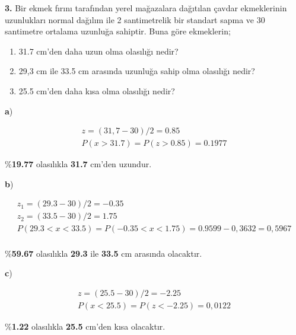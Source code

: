 \documentclass[a4paper,10pt]{article}
\begin{document}
\pagebreak

\textbf{3.} Bir ekmek fırını tarafından yerel mağazalara dağıtılan çavdar ekmeklerinin uzunlukları normal dağılım ile 2
santimetrelik bir standart sapma ve 30 santimetre ortalama uzunluğa sahiptir. Buna göre ekmeklerin;

\begin{center}
  \begin{enumerate}[label=(\alph*)]
    \item  31.7 cm’den daha uzun olma olasılığı nedir?
    \item  29,3 cm ile 33.5 cm arasında uzunluğa sahip olma olasılığı nedir?
    \item  25.5 cm’den daha kısa olma olasılığı nedir?
  \end{enumerate}
\end{center}

\vspace{1cm}
\textbf{a})

$$\begin{array}{l}
z=(31,7-30) / 2=0.85 \\
P(x>31.7)=P(z>0.85)=0.1977
\end{array}$$

\begin{center}
\%\textbf{19.77} olasılıkla \textbf{31.7} cm'den uzundur.
\end{center}


\vspace{1cm}
\textbf{b})

$$\begin{array}{l}
z_{1}=(29.3-30) / 2=-0.35 \\
z_{2}=(33.5-30) / 2=1.75 \\
P(29.3<x<33.5)=P(-0.35 < x < 1.75)=0.9599-0,3632=0,5967 \\
\end{array}$$

\begin{center}
\%\textbf{59.67} olasılıkla \textbf{29.3} ile \textbf{33.5} cm arasında olacaktır.
\end{center}

\vspace{1cm}
\textbf{c})

$$\begin{array}{l}
z=(25.5-30) / 2=-2.25 \\
P(x<25.5)=P(z<-2.25)=0,0122
\end{array}$$


\begin{center}
\%\textbf{1.22} olasılıkla \textbf{25.5} cm'den kısa olacaktır.
\end{center}
\end{document}
